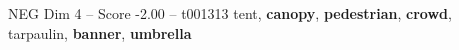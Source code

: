 \begin{textsample}{NEG Dim 4 – Score -2.00 – t001313}  \label{ex:f4_neg_031}
tent, \textbf{canopy}, \textbf{pedestrian}, \textbf{crowd}, tarpaulin, \textbf{banner}, \textbf{umbrella}

\end{textsample}
